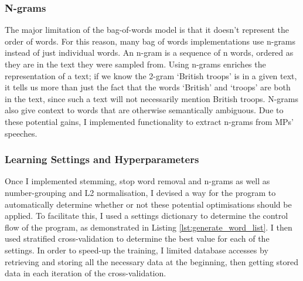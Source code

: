 \documentclass[12pt,a4paper,twoside,openright]{report}
\newcommand{\mylisting}[4]{}
\newcommand{\pylisting}[2]{\mylisting{Python}{py}{#1}{#2}}
\begin{document}
\subsubsection{N-grams}

The major limitation of the bag-of-words model is that it doesn't represent the order of words. For this reason, many bag of words implementations use n-grams instead of just individual words. An n-gram is a sequence of n words, ordered as they are in the text they were sampled from. Using n-grams enriches the representation of a text; if we know the 2-gram `British troops' is in a given text, it tells us more than just the fact that the words `British' and `troops' are both in the text, since such a text will not necessarily mention British troops. N-grams also give context to words that are otherwise semantically ambiguous. Due to these potential gains, I implemented functionality to extract n-grams from MPs' speeches.

\subsubsection{Learning Settings and Hyperparameters} \label{impl-learning}

Once I implemented stemming, stop word removal and n-grams as well as number-grouping and L2 normalisation, I devised a way for the program to automatically determine whether or not these potential optimisations should be applied. To facilitate this, I used a settings dictionary to determine the control flow of the program, as demonstrated in Listing \ref{lst:generate_word_list}. I then used stratified cross-validation to determine the best value for each of the settings. In order to speed-up the training, I limited database accesses by retrieving and storing all the necessary data at the beginning, then getting stored data in each iteration of the cross-validation.
\\\\
\pylisting{A function which uses given settings to produce a word list of a given text.}{generate_word_list}
\end{document}

